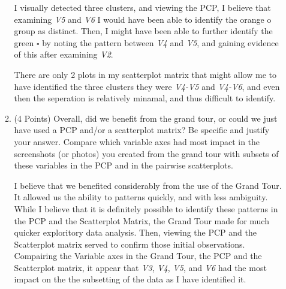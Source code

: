 \documentclass[12pt,letterpaper,final]{article}
\begin{document}
\begin{enumerate}
\begin{enumerate}
{\scriptsize
  I visually detected three clusters, and viewing the PCP, I believe that examining {\it V5} and {\it V6} I would have been able to identify the {\color{orange} orange o} group as distinct. Then, I might have been able to further identify the {\color{green} green $\square$} by noting the pattern between {\it V4} and {\it V5}, and gaining evidence of this after examining {\it V2}.

There are only 2 plots in my scatterplot matrix that might allow me to have identified the three clusters they were {\it V4-V5} and {\it V4-V6}, and even then the seperation is relatively minamal, and thus difficult to identify.
}


\item (4 Points)
Overall, did we benefit from the grand tour, or could we just have used
a PCP and/or a scatterplot matrix? Be specific and justify your answer.
Compare which variable axes had most impact in the screenshots (or photos) you created
from the grand tour with subsets of these variables in the PCP and in the
pairwise scatterplots. 

{\scriptsize
  I believe that we benefited considerably from the use of the Grand Tour.  It allowed us the ability to patterns quickly, and with less ambiguity.  While I believe that it is definitely possible to identify these patterns in the PCP and the Scatterplot Matrix, the Grand Tour made for much quicker exploritory data analysis.  Then, viewing the PCP and the Scatterplot matrix served to confirm those initial observations.\\
  
  Compairing the Variable axes in the Grand Tour, the PCP and the Scatterplot matrix, it appear that {\it V3}, {\it V4}, {\it V5}, and {\it V6} had the most impact on the the subsetting of the data as I have identified it.\\
}

\end{enumerate}


\end{enumerate}


\newpage


~\\
\end{document}
